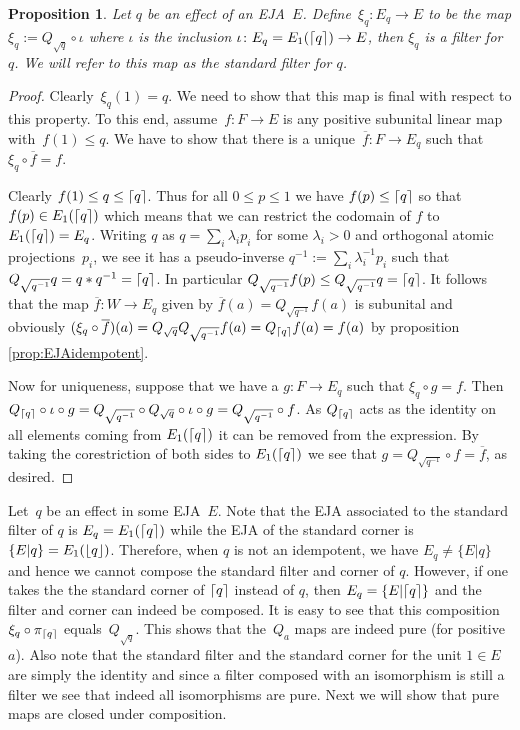 \documentclass[submission,copyright,creativecommons]{eptcs}
\newcounter{main}
\newtheorem{proposition}[main]{Proposition}
\theoremstyle{definition}
\DeclarePairedDelimiter{\ceil}{\lceil}{\rceil}
\DeclarePairedDelimiter{\floor}{\lfloor}{\rfloor}
\newcommand{\cl}[1]{\overline{#1}}
\begin{document}
\begin{proposition}\label{eja:filter}
	Let $q$ be an effect of an EJA~$E$. Define~$\xi_q\colon E_q \rightarrow E$ to
	be the map $\xi_q := Q_{\sqrt{q}} \circ \iota$ where $\iota$
	is the inclusion $\iota\colon E_q = E_1(\ceil{q})\rightarrow E$,
	then $\xi_q$ is a filter for $q$. We will refer to this map
	as the \emph{standard filter} for $q$.
\end{proposition}
\begin{proof}
	Clearly~$\xi_q(1)=q$. We need to show that this map is final
    with respect to this property.
    To this end, assume~$f\colon F\rightarrow E$ is any positive subunital linear map with~$f(1)\leq q$.
    We have to show that there is a unique~$\cl{f}:F\rightarrow E_q$ such that $\xi_q\circ
	\cl{f}=f$.

	Clearly $f(1)\leq q\leq \ceil{q}$.
    Thus for all $0\leq p\leq 1$ we have $f(p)\leq \ceil{q}$ so
    that $f(p)\in E_1(\ceil{q})$ which means that we can restrict
    the codomain of $f$ to $E_1(\ceil{q})=E_q$. Writing $q$ as
    $q=\sum_i \lambda_i p_i$ for some $\lambda_i>0$ and orthogonal atomic projections~$p_i$, we see it has
    a pseudo-inverse $q^{-1}:=\sum_i \lambda_i^{-1} p_i$ such that
    $Q_{\sqrt{q^{-1}}}q = q* q^{-1} = \ceil{q}$. In particular
    $Q_{\sqrt{q^{-1}}}f(p)\leq Q_{\sqrt{q^{-1}}}q = \ceil{q}$. It
    follows that the map $\cl{f}:W\rightarrow E_q$ given by
    $\cl{f}(a)=Q_{\sqrt{q^{-1}}}f(a)$ is subunital and obviously
    $(\xi_q\circ \cl{f})(a) = Q_{\sqrt{q}}Q_{\sqrt{q^{-1}}} f(a) =
    Q_{\ceil{q}}f(a) = f(a)$ by proposition \ref{prop:EJAidempotent}.

	Now for uniqueness, suppose that we have a $g:F\rightarrow E_q$ such that $\xi_q\circ g = f$. Then $Q_{\ceil{q}}\circ \iota \circ g = Q_{\sqrt{q^{-1}}} \circ Q_{\sqrt{q}} \circ \iota\circ g= Q_{\sqrt{q^{-1}}}\circ f$. As $Q_{\ceil{q}}$ acts as the identity on all elements coming from $E_1(\ceil{q})$ it can be removed from the expression. By taking the corestriction of both sides to $E_1(\ceil{q})$ we see that $g=Q_{\sqrt{q^{-1}}}\circ f = \cl{f}$, as desired.
\end{proof}

Let~$q$ be an effect in some EJA~$E$.
Note that the EJA associated to the
standard filter of $q$ is $E_q = E_1(\ceil{q})$ while the EJA of
the standard corner is $\{E\lvert q\} = E_1(\floor{q})$. 
Therefore, when $q$ is not an idempotent, we have $E_q\neq \{E\lvert q\}$and hence we cannot compose the standard filter and corner of $q$.
However, if one takes the the standard
corner of $\ceil{q}$ instead of $q$, then $E_q=\{E\lvert \ceil{q}\}$ and the filter and corner can indeed be composed.
It is easy to see that this composition~$\xi_q\circ \pi_{\ceil{q}}$ equals~$Q_{\sqrt{q}}$.
This shows that the~$Q_a$ maps are indeed pure (for positive~$a$).
Also note that the standard filter and the standard corner for the unit
    $1\in E$ are simply the identity and since a filter composed
with an isomorphism is still a filter we see that indeed all
isomorphisms are pure.
Next we will show that pure maps are closed under composition.
\end{document}
